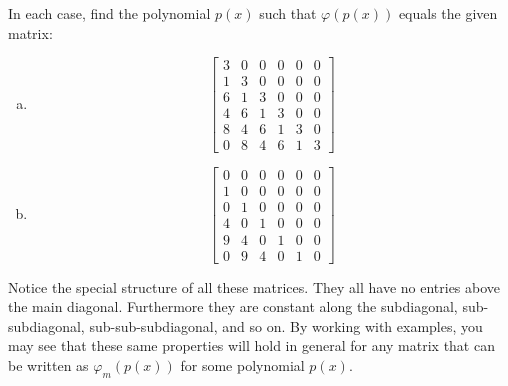 \begin{exercise}{}
In each case, find the polynomial $p(x)$ such that $\varphi(p(x))$ equals the given matrix:
\begin{enumerate}[(a)]
\item
\[\left[\begin{array}{cccccc}3 & 0 & 0 & 0 & 0 & 0\\1 & 3 & 0 & 0 & 0 & 0\\6 & 1 & 3 & 0 & 0 & 0\\4 & 6 & 1 & 3 & 0 & 0\\8 & 4 & 6 & 1 & 3 & 0\\0 & 8 & 4 & 6 & 1 & 3\end{array}\right]\]
\item
\[\left[\begin{array}{cccccc}0 & 0 & 0 & 0 & 0 & 0\\1 & 0 & 0 & 0 & 0 & 0\\0 & 1 & 0 & 0 & 0 & 0\\4 & 0 & 1 & 0 & 0 & 0\\9 & 4 & 0 & 1 & 0 & 0\\0 & 9 & 4 & 0 & 1 & 0\end{array}\right]\]
\end{enumerate}
\end{exercise}
Notice the special structure of all these matrices. They all have no entries above the main diagonal. Furthermore they are constant along the subdiagonal, sub-subdiagonal, sub-sub-subdiagonal, and so on.
By working with examples, you may see that these same properties will hold in general for any matrix that can be written as $\varphi_m(p(x))$ for some polynomial $p(x)$.


